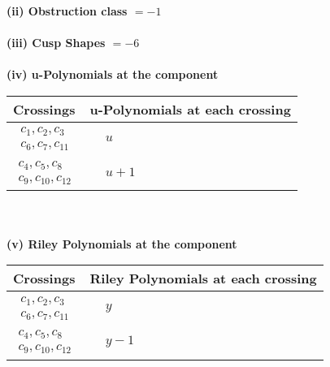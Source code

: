 \documentclass[1p]{elsarticle_modified}
\theoremstyle{definition}
\begin{document}
\flushleft \textbf{(ii) Obstruction class $= -1$}\\~\\
\flushleft \textbf{(iii) Cusp Shapes $= -6$}\\~\\
\newpage\renewcommand{\arraystretch}{1}
\flushleft \textbf{(iv) u-Polynomials at the component}\newline \\
\begin{tabular}{m{50pt}|m{274pt}}
Crossings & \hspace{64pt}u-Polynomials at each crossing \\
\hline $$\begin{aligned}c_{1},c_{2},c_{3}\\c_{6},c_{7},c_{11}\end{aligned}$$&$\begin{aligned}
&u
\end{aligned}$\\
\hline $$\begin{aligned}c_{4},c_{5},c_{8}\\c_{9},c_{10},c_{12}\end{aligned}$$&$\begin{aligned}
&u+1
\end{aligned}$\\
\hline
\end{tabular}\\~\\
\newpage\renewcommand{\arraystretch}{1}
\flushleft \textbf{(v) Riley Polynomials at the component}\newline \\
\begin{tabular}{m{50pt}|m{274pt}}
Crossings & \hspace{64pt}Riley Polynomials at each crossing \\
\hline $$\begin{aligned}c_{1},c_{2},c_{3}\\c_{6},c_{7},c_{11}\end{aligned}$$&$\begin{aligned}
&y
\end{aligned}$\\
\hline $$\begin{aligned}c_{4},c_{5},c_{8}\\c_{9},c_{10},c_{12}\end{aligned}$$&$\begin{aligned}
&y-1
\end{aligned}$\\
\hline
\end{tabular}\\~\\
\end{document}
